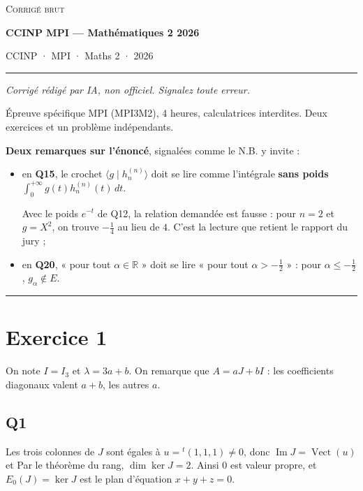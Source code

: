 \documentclass[11pt,a4paper]{article}
\newcommand{\equationajustee}[1]{%
  \sbox{\boiteequation}{$\displaystyle #1$}%
  \ifdim\wd\boiteequation>\linewidth
    \[\resizebox{\linewidth}{!}{\usebox{\boiteequation}}\]%
  \else
    \[#1\]%
  \fi}
\begin{document}
\thispagestyle{plain}
\begin{center}
  {\small\scshape Corrigé brut}\par\smallskip
  {\LARGE\bfseries CCINP MPI — Mathématiques 2 2026\par}\medskip
  {\large CCINP · MPI · Maths 2 · 2026\par}
\end{center}
\vspace{2pt}\hrule\vspace{8pt}

\emph{Corrigé rédigé par IA, non officiel. Signalez toute erreur.}

Épreuve spécifique MPI (MPI3M2), 4 heures, calculatrices interdites. Deux exercices et un problème indépendants.

\textbf{Deux remarques sur l'énoncé}, signalées comme le N.B. y invite :

\begin{itemize}
\item
  en \textbf{Q15}, le crochet \(\langle g\mid h_n^{(n)}\rangle\) doit se lire comme l'intégrale \textbf{sans poids} \(\int_0^{+\infty}g(t)h_n^{(n)}(t)\,dt\).

  Avec le poids \(e^{-t}\) de Q12, la relation demandée est fausse : pour \(n=2\) et \(g=X^2\), on trouve \(-\frac14\) au lieu de \(4\). C'est la lecture que retient le rapport du jury ;
\item
  en \textbf{Q20}, « pour tout \(\alpha\in\mathbb R\) » doit se lire « pour tout \(\alpha>-\frac12\) » : pour \(\alpha\le-\frac12\), \(g_\alpha\notin E\).
\end{itemize}

\begin{center}\rule{0.5\linewidth}{0.5pt}\end{center}

\hypertarget{exercice-1}{%
\section{Exercice 1}\label{exercice-1}}

On note \(I=I_3\) et \(\lambda=3a+b\). On remarque que \(A=aJ+bI\) : les coefficients diagonaux valent \(a+b\), les autres \(a\).

\hypertarget{q1}{%
\subsection{Q1}\label{q1}}

Les trois colonnes de \(J\) sont égales à \(u={}^t(1,1,1)\neq0\), donc \(\operatorname{Im}J=\operatorname{Vect}(u)\) et
\equationajustee{\boxed{\operatorname{rg}J=1.}}
Par le théorème du rang, \(\dim\ker J=2\). Ainsi \(0\) est valeur propre, et \(E_0(J)=\ker J\) est le plan d'équation \(x+y+z=0\).
\end{document}
